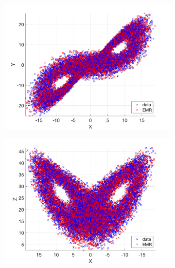 \documentclass[12pt]{article}
\begin{document}
\begin{figure}[H]
	\centering
	\begin{subfigure}[b]{0.3\textwidth}
		\centering
		\includegraphics[width=\textwidth]{plots/l63/traj1.png}
	\end{subfigure}
	\hfill
	\begin{subfigure}[b]{0.3\textwidth}
		\centering
		\includegraphics[width=\textwidth]{plots/l63/traj2.png}
	\end{subfigure}
	\hfill
	\begin{subfigure}[b]{0.3\textwidth}
		\centering

\end{subfigure}
\end{figure}
\end{document}
